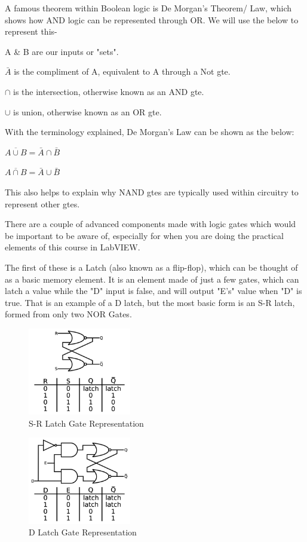 \documentclass[a4paper,11pt]{report}
\begin{document}
A famous theorem within Boolean logic is De Morgan's Theorem/ Law, which shows how AND logic can be represented through OR. We will use the below to represent this-

A \& B are our inputs or "sets".

$\bar{A}$ is the compliment of A, equivalent to A through a Not \gls{gte}.

$\cap$ is the intersection, otherwise known as an AND \gls{gte}.

$\cup$ is union, otherwise known as an OR \gls{gte}.

With the terminology explained, De Morgan's Law can be shown as the below:

$\overline{A\cup B} = \bar{A}\cap\bar{B}$

$\overline{A\cap B} = \bar{A}\cup\bar{B}$

This also helps to explain why NAND \gls{gte}s are typically used within circuitry to represent other \gls{gte}s.

There are a couple of advanced components made with logic gates which would be important to be aware of, especially for when you are doing the practical elements of this course in LabVIEW.

The first of these is a Latch (also known as a flip-flop), which can be thought of as a basic memory element. It is an element made of just a few gates, which can latch a value while the "D" input is false, and will output "E's" value when "D" is true. That is an example of a D latch, but the most basic form is an S-R latch, formed from only two NOR Gates.

\begin{figure}[H]
\centering
\includegraphics[width=0.4\textwidth]{srlatch}
\caption{S-R Latch Gate Representation}
\end{figure}

\begin{figure}[H]
\centering
\includegraphics[width=0.4\textwidth]{dlatch}
\caption{D Latch Gate Representation}
\end{figure}
\end{document}
